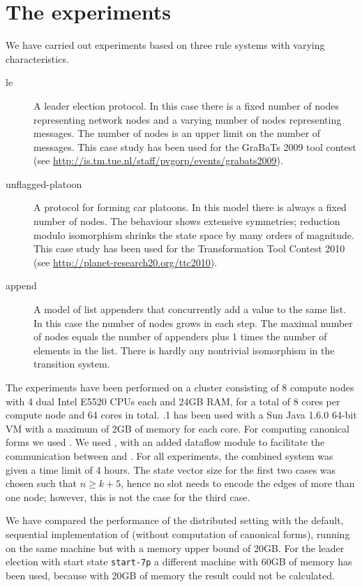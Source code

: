 \section{The experiments}

We have carried out experiments based on three rule systems with varying
characteristics.

\begin{description}
\item[le] A leader election protocol. In this case there is a fixed number of
  nodes representing network nodes and a varying number of nodes
  representing messages. The number of nodes is an upper limit on the number of
  messages. This case study has been used for the GraBaTs 2009 tool
  contest (see \url{http://is.tm.tue.nl/staff/pvgorp/events/grabats2009}).

\item[unflagged-platoon] A protocol for forming car platoons. In this model
  there is always a fixed number of nodes. The behaviour shows extensive
  symmetries; reduction modulo isomorphism shrinks the state space by many
  orders of magnitude. This case study has been used for the Transformation
  Tool Contest 2010 (see \url{http://planet-research20.org/ttc2010}).

\item[append] A model of list appenders that concurrently add a value to the
  same list. In this case the number of nodes grows in each step. The maximal
  number of nodes equals the number of appenders plus 1 times the number of
  elements in the list. There is hardly any nontrivial isomorphism in the
  transition system.
\end{description}
%
The experiments have been performed on a cluster consisting of 8 compute nodes
with 4 dual Intel E5520 CPUs each and 24GB RAM, for a total of 8 cores per
compute node and 64 cores in total.  .1 has been used with a Sun
Java 1.6.0 64-bit VM with a maximum of 2GB of memory for each core. For
computing canonical forms we used . We used , with an
added dataflow module to facilitate the communication between \LTSMIN and
\GROOVE. For all experiments, the combined system was given a time limit of 4
hours. The state vector size for the first two cases was chosen such that
$n\geq k+5$, hence no slot needs to encode the edges of more than one node;
however, this is not the case for the third case.

We have compared the performance of the distributed setting with the default,
sequential implementation of \GROOVE (without computation of canonical forms), 
running on the same machine but with a
memory upper bound of 20GB. For the leader election with start state
\texttt{start-7p} a different machine with 60GB of memory has been used,
because with 20GB of memory the result could not be calculated.

